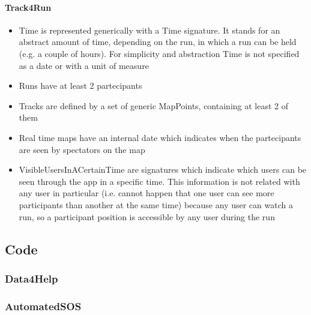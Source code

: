 \paragraph{Track4Run}
\begin{itemize}
\item Time is represented generically with a Time signature. It stands for an abstract amount of time, depending on the run, in which a run can be held (e.g. a couple of hours).
For simplicity and abstraction Time is not specified as a date or with a unit of measure
\item Runs have at least 2 partecipants
\item Tracks are defined by a set of generic MapPoints, containing at least 2 of them
\item Real time maps have an internal date which indicates when the partecipants are seen by spectators on the map
\item VisibleUsersInACertainTime are signatures which indicate which users can be seen through the app in a specific time. This information is not related with any user in particular (i.e. cannot happen that one user can see more participants than another at the same time) because any user can watch a run, so a participant position is accessible by any user during the run
\end{itemize}
\newpage
{\color{secblue}\subsection{Code}}
{\color{secblue}\subsubsection{Data4Help}}

\newpage
{\color{secblue}\subsubsection{AutomatedSOS}}
